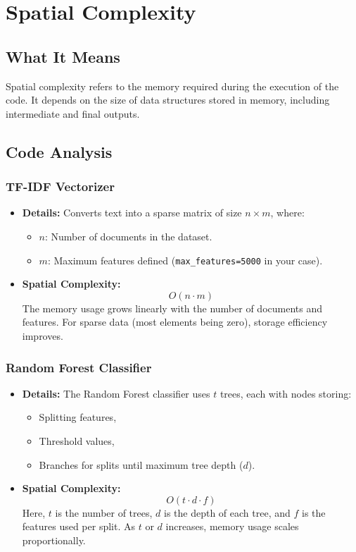 \documentclass[runningheads,a4paper,11pt]{report}
\begin{document}
\section{Spatial Complexity}
\label{section:spatial-complexity}

\subsection{What It Means}
\label{section:what-it-means}
Spatial complexity refers to the memory required during the execution of the code. It depends on the size of data structures stored in memory, including intermediate and final outputs.

\subsection{Code Analysis}
\label{section:code}

\subsubsection{TF-IDF Vectorizer}
\label{section:tf-idf}
\begin{itemize}
  \item \textbf{Details:} Converts text into a sparse matrix of size $n \times m$, where:
  \begin{itemize}
    \item $n$: Number of documents in the dataset.
    \item $m$: Maximum features defined (\texttt{max\_features=5000} in your case).
  \end{itemize}
  \item \textbf{Spatial Complexity:}
  \[
  O(n \cdot m)
  \]
  The memory usage grows linearly with the number of documents and features. For sparse data (most elements being zero), storage efficiency improves.
\end{itemize}

\subsubsection{Random Forest Classifier}
\label{section:random-classifier}
\begin{itemize}
  \item \textbf{Details:} The Random Forest classifier uses $t$ trees, each with nodes storing:
  \begin{itemize}
    \item Splitting features,
    \item Threshold values,
    \item Branches for splits until maximum tree depth ($d$).
  \end{itemize}
  \item \textbf{Spatial Complexity:}
  \[
  O(t \cdot d \cdot f)
  \]
  Here, $t$ is the number of trees, $d$ is the depth of each tree, and $f$ is the features used per split. As $t$ or $d$ increases, memory usage scales proportionally.
\end{itemize}
\end{document}
